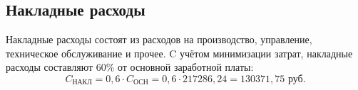 \subsection{Накладные расходы} \label{other_costs_2}

Накладные расходы состоят из расходов на производство, управление, техническое обслуживание и прочее. C учётом минимизации затрат, накладные расходы составляют 60\% от основной заработной платы:
\begin{equation}
  \label{eq:other_costs_2}
C_\textrm{НАКЛ} = 0,6 \cdot C_\textrm{ОСН} = 0,6 \cdot 217286,24 = 130371,75 \textrm{ руб.}
\end{equation}